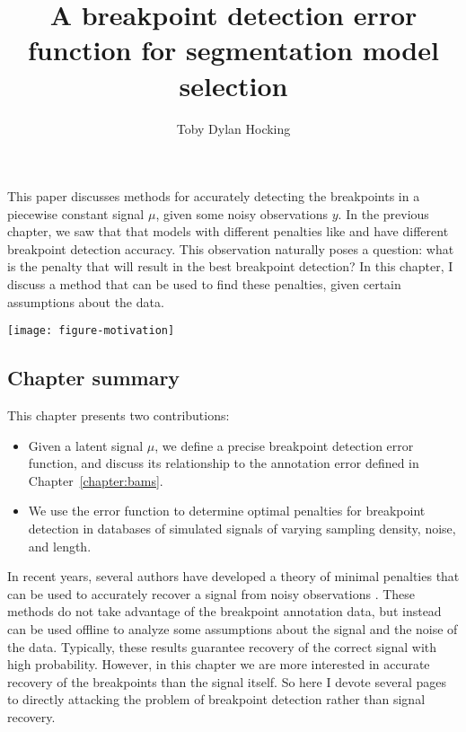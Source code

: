 \documentclass{article}
\begin{document}
\title{A breakpoint detection error function for segmentation model
  selection}
\author{Toby Dylan Hocking}

This paper discusses methods for accurately detecting the
breakpoints in a piecewise constant signal $\mu$, given some noisy
observations $y$. In the previous chapter, we saw that that models
with different penalties like  and  have
different breakpoint detection accuracy. This observation naturally
poses a question: what is the penalty that will result in the best
breakpoint detection? In this chapter, I discuss a method that can be
used to find these penalties, given certain assumptions about the
data.

\begin{center}
  \texttt{[image: figure-motivation]}
\end{center}

\subsection{Chapter summary}

This chapter presents two contributions:
\begin{itemize}
\item Given a latent signal $\mu$, we define a precise breakpoint
  detection error function, and discuss its relationship to the
  annotation error defined in Chapter~\ref{chapter:bams}.
\item We use the error function to determine optimal penalties for
  breakpoint detection in databases of simulated signals of varying
  sampling density, noise, and length.
\end{itemize}

In recent years, several authors have developed a theory of minimal
penalties that can be used to accurately recover a signal from noisy
observations \citep{calibration,lebarbier}. These methods do not take
advantage of the breakpoint annotation data, but instead can be used
offline to analyze some assumptions about the signal and the noise of
the data. Typically, these results guarantee recovery of the correct
signal with high probability. However, in this chapter we are more
interested in accurate recovery of the breakpoints than the signal
itself.
So here I devote several
pages to directly attacking the problem of breakpoint detection rather
than signal recovery.
\end{document}
